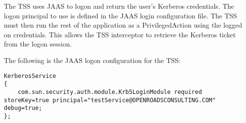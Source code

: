 The TSS uses JAAS to logon and return the user's Kerberos credentials. The
logon principal to use is defined in the JAAS login configuration file.
The TSS must then run the rest of the application as a PrivilegedAction using
the logged on credentials. This allows the TSS interceptor to retrieve the
Kerberos ticket from the logon session.

The following is the JAAS logon configuration for the TSS:

\begin{scriptsize}
\begin{verbatim}
KerberosService 
{
    com.sun.security.auth.module.Krb5LoginModule required storeKey=true principal="testService@OPENROADSCONSULTING.COM" debug=true;
};
\end{verbatim}
\end{scriptsize}

